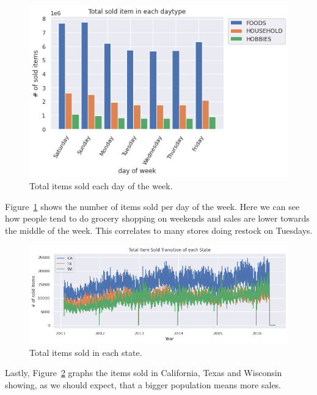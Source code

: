 \documentclass[10pt,twocolumn,letterpaper]{article}
\begin{document}
\begin{figure}
  \begin{center}
    \includegraphics[width=0.8\linewidth]{img/totalSoldItemInEachDayOfWeek.png}
  \end{center}
    \caption{Total items sold each day of the week. \cite{ryuheeeei_2020}}
  \label{fig:totalSoldItemInEachDayOfWeek}
\end{figure}
  Figure~\ref{fig:totalSoldItemInEachDayOfWeek} shows the number of items sold
  per day of the week. Here we can see how people tend to do grocery shopping on
  weekends and sales are lower towards the middle of the week. This correlates
  to many stores doing restock on Tuesdays.

\begin{figure}
  \begin{center}
    \includegraphics[width=0.8\linewidth]{img/totalItemSoldInEachState.png}
  \end{center}
    \caption{Total items sold in each state.\cite{ryuheeeei_2020}}
  \label{fig:totalItemSoldInEachState}
\end{figure}
  Lastly, Figure~\ref{fig:totalItemSoldInEachState} graphs the items sold in
  California, Texas and Wisconsin showing, as we should expect, that a bigger
  population means more sales.

\end{document}
